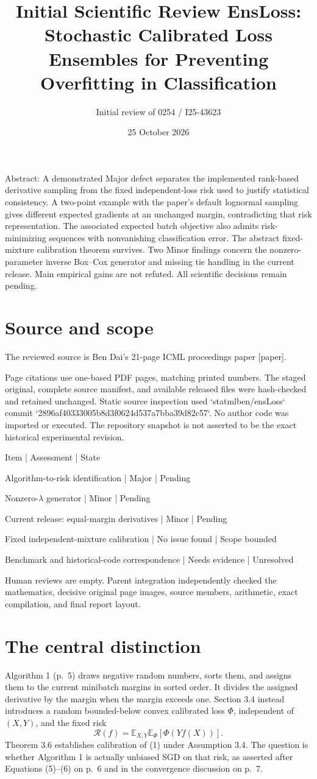 \documentclass[10pt]{article}
\title{Initial Scientific Review
EnsLoss: Stochastic Calibrated Loss Ensembles for Preventing Overfitting in Classification}
\author{Initial review of 0254 / I25-43623}
\date{25 October 2026}
\begin{document}
\maketitle
Abstract: A demonstrated Major defect separates the implemented rank-based derivative sampling from the fixed independent-loss risk used to justify statistical consistency. A two-point example with the paper’s default lognormal sampling gives different expected gradients at an unchanged margin, contradicting that risk representation. The associated expected batch objective also admits risk-minimizing sequences with nonvanishing classification error. The abstract fixed-mixture calibration theorem survives. Two Minor findings concern the nonzero-parameter inverse Box–Cox generator and missing tie handling in the current release. Main empirical gains are not refuted. All scientific decisions remain pending.\par
\section*{Source and scope}
The reviewed source is Ben Dai’s 21-page ICML proceedings paper [paper].\par
Page citations use one-based PDF pages, matching printed numbers. The staged original, complete source manifest, and available released files were hash-checked and retained unchanged. Static source inspection used `statmlben/ensLoss` commit `2896af40333005b8d3f0624d537a7bba39d82c57`. No author code was imported or executed. The repository snapshot is not asserted to be the exact historical experimental revision.\par
Item | Assessment | State\par
Algorithm-to-risk identification | Major | Pending\par
Nonzero-\(\lambda\) generator | Minor | Pending\par
Current release: equal-margin derivatives | Minor | Pending\par
Fixed independent-mixture calibration | No issue found | Scope bounded\par
Benchmark and historical-code correspondence | Needs evidence | Unresolved\par
Human reviews are empty. Parent integration independently checked the mathematics, decisive original page images, source members, arithmetic, exact compilation, and final report layout.\par
\section*{The central distinction}
Algorithm 1 (p. 5) draws negative random numbers, sorts them, and assigns them to the current minibatch margins in sorted order. It divides the assigned derivative by the margin when the margin exceeds one. Section 3.4 instead introduces a random bounded-below convex calibrated loss \(\Phi\), independent of \((X,Y)\), and the fixed risk \[\mathcal R(f)=\mathbb E_{X,Y}\mathbb E_\Phi[\Phi(Yf(X))].
 \tag{1}\] Theorem 3.6 establishes calibration of (1) under Assumption 3.4. The question is whether Algorithm 1 is actually unbiased SGD on that risk, as asserted after Equations (5)–(6) on p. 6 and in the convergence discussion on p. 7.\par
\end{document}
